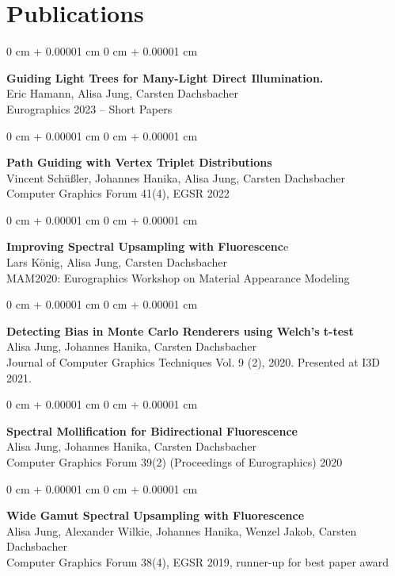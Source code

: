 \documentclass[10pt, letterpaper]{article}
\newenvironment{onecolentry}{
    \begin{adjustwidth}{
        0 cm + 0.00001 cm
    }{
        0 cm + 0.00001 cm
    }
}{
    \end{adjustwidth}
} %
\begin{document}
    \section{Publications}
    \sectspacetop
            \begin{samepage}
    \begin{onecolentry}
\textbf{Guiding Light Trees for Many-Light Direct Illumination.}\\
Eric Hamann, Alisa Jung, Carsten Dachsbacher\\
Eurographics 2023 – Short Papers
        \end{onecolentry}
    \begin{onecolentry}
    \textbf{Path Guiding with Vertex Triplet Distributions}\\
Vincent Schüßler, Johannes Hanika, Alisa Jung, Carsten Dachsbacher\\
Computer Graphics Forum 41(4), EGSR 2022
    \end{onecolentry}
    \begin{onecolentry}
    \textbf{Improving Spectral Upsampling with Fluorescenc}e\\
Lars König, Alisa Jung, Carsten Dachsbacher\\
MAM2020: Eurographics Workshop on Material Appearance Modeling
    \end{onecolentry}
    \begin{onecolentry}
\textbf{Detecting Bias in Monte Carlo Renderers using Welch’s t-test}\\
Alisa Jung, Johannes Hanika, Carsten Dachsbacher\\
Journal of Computer Graphics Techniques Vol. 9 (2), 2020. Presented at I3D 2021.    
    \end{onecolentry}
    \begin{onecolentry}
\textbf{Spectral Mollification for Bidirectional Fluorescence}\\
Alisa Jung, Johannes Hanika, Carsten Dachsbacher\\
Computer Graphics Forum 39(2) (Proceedings of Eurographics) 2020
    \end{onecolentry}
    \begin{onecolentry}
\textbf{Wide Gamut Spectral Upsampling with Fluorescence}\\
Alisa Jung, Alexander Wilkie, Johannes Hanika, Wenzel Jakob, Carsten Dachsbacher\\
Computer Graphics Forum 38(4), EGSR 2019, runner-up for best paper award

\end{onecolentry}
\end{samepage}
\end{document}
